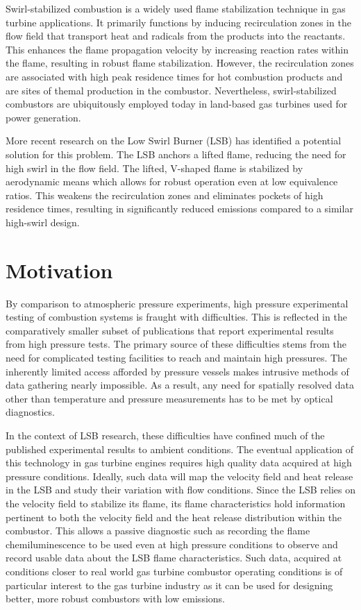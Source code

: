 Swirl-stabilized combustion is a widely used flame stabilization technique in gas turbine applications.\cite{1974-syred,1977-lilley}
It primarily functions by inducing recirculation zones in the flow field that transport heat and radicals from the products into the reactants.
This enhances the flame propagation velocity by increasing reaction rates within the flame, resulting in robust flame stabilization.
However, the recirculation zones are associated with high peak residence times for hot combustion products and are sites of themal  production in the combustor.
Nevertheless, swirl-stabilized combustors are ubiquitously employed today in land-based gas turbines used for power generation.

More recent research\cite{1995-bedat} on the Low Swirl Burner (LSB) has identified a potential solution for this problem.
The LSB anchors a lifted flame, reducing the need for high swirl in the flow field.
The lifted, V-shaped flame is stabilized by aerodynamic means which allows for robust operation even at low equivalence ratios.
This weakens the recirculation zones and eliminates pockets of high residence times, resulting in significantly reduced  emissions compared to a similar high-swirl design.

\section{Motivation}

By comparison to atmospheric pressure experiments, high pressure experimental testing of combustion systems is fraught with difficulties.
This is reflected in the comparatively smaller subset of publications that report experimental results from high pressure tests.
The primary source of these difficulties stems from the need for complicated testing facilities to reach and maintain high pressures.
The inherently limited access afforded by pressure vessels makes intrusive methods of data gathering nearly impossible.
As a result, any need for spatially resolved data other than temperature and pressure measurements has to be met by optical diagnostics.

In the context of LSB research, these difficulties have confined much of the published experimental results to ambient conditions.
The eventual application of this technology in gas turbine engines requires high quality data acquired at high pressure conditions.
Ideally, such data will map the velocity field and heat release in the LSB and study their variation with flow conditions.
Since the LSB relies on the velocity field to stabilize its flame, its flame characteristics hold information pertinent to both the velocity field and the heat release distribution within the combustor.
This allows a passive diagnostic such as recording the flame chemiluminescence to be used even at high pressure conditions to observe and record usable data about the LSB flame characteristics.
Such data, acquired at conditions closer to real world gas turbine combustor operating conditions is of particular interest to the gas turbine industry as it can be used for designing better, more robust combustors with low  emissions.

